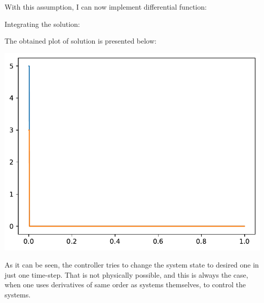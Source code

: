 \documentclass[a4paper,12pt]{article}
\begin{document}
    With this assumption, I can now implement differential function:
    
    Integrating the solution:
    
    The obtained plot of solution is presented below:
    \begin{center}
        \includegraphics[width=\linewidth]{2d.pdf}
    \end{center}
    As it can be seen, the controller tries to change the system state to desired 
    one in just one time-step. That is not physically possible, and this is always
    the case, when one uses derivatives of same order as systems themselves, to control
    the systems.
\end{document}
